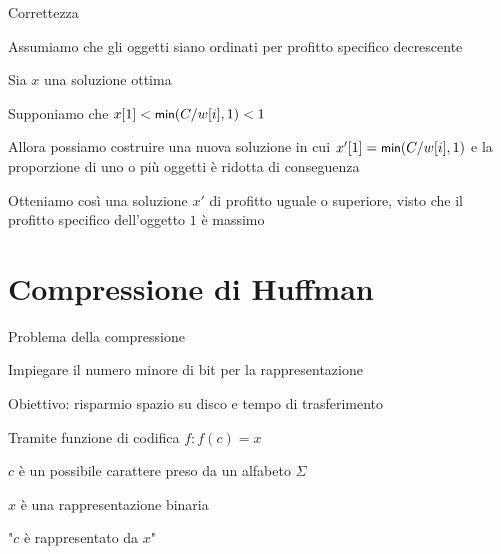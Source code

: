 \begin{frame}{Correttezza}


\BIL
\item Assumiamo che gli oggetti siano ordinati per profitto specifico decrescente
\item Sia $x$ una soluzione ottima
\item Supponiamo che $x[1] < \textsf{{\small min}}(C/w[i], 1) < 1$ 
\item Allora possiamo costruire una nuova soluzione in cui $x'[1] = \textsf{{\small min}}(C/w[i], 1)$ e 
la proporzione di uno o più oggetti è ridotta di conseguenza
\item Otteniamo così una soluzione $x'$ di profitto uguale o superiore, visto
che il profitto specifico dell'oggetto $1$ è massimo
\EIL

\end{frame}

\section{Compressione di Huffman}


\begin{frame}{Problema della compressione}

\BIL
\item Impiegare il numero minore di bit per la rappresentazione
\item Obiettivo: risparmio spazio su disco e tempo di trasferimento
\EIL

\BIL
\item Tramite \alert{funzione di codifica} $f: f(c) = x$
\BI
	\item $c$ è un possibile carattere preso da un alfabeto $\Sigma$
	\item $x$ è una rappresentazione binaria
	\item "$c$ è rappresentato da $x$"
\EI
\EIL
\end{frame}

